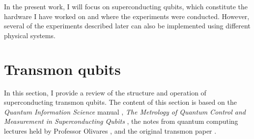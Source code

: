 In the present work, I will focus on superconducting qubits, which constitute the hardware I have worked on and where the experiments were conducted. 
However, several of the experiments described later can also be implemented using different physical systems.

\section{Transmon qubits}
In this section, I provide a review of the structure and operation of superconducting transmon qubits. 
The content of this section is based on the \textit{Quantum Information Science} manual \cite{manenti_quantum_2023}, \textit{The Metrology of Quantum Control and Measurement in Superconducting Qubits} \cite{Chen2018}, the notes from quantum computing lectures held by Professor Olivares \cite{Olivares2021}, and the original transmon paper \cite{TransmonPaper}.

